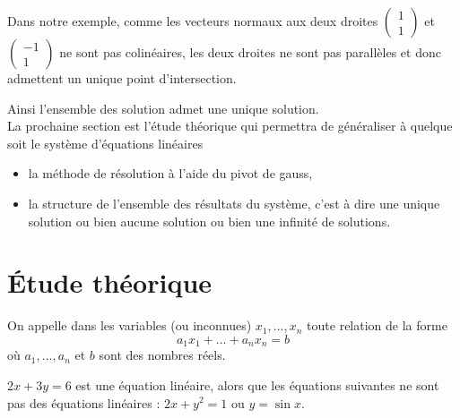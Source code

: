 \documentclass[a4paper]{book}
\begin{document}
Dans notre exemple, comme les vecteurs normaux aux deux droites $\begin{pmatrix}
1\\1
\end{pmatrix}$ et $\begin{pmatrix}
-1\\1
\end{pmatrix}$ ne sont pas colinéaires, les deux droites ne sont pas parallèles et donc admettent un unique point d'intersection.
\begin{center}
\end{center}
Ainsi l'ensemble des solution admet une unique solution.\\
La prochaine section est l'étude théorique qui permettra de généraliser à quelque soit le système d'équations linéaires
\begin{itemize}
\item la méthode de résolution à l'aide du pivot de gauss,
\item la structure de l'ensemble des résultats du système, c'est à dire  une unique solution ou bien aucune solution ou bien une infinité de solutions.
\end{itemize}


\section{Étude théorique}
\begin{Definition}
On appelle  dans les variables  (ou inconnues) $x_1,\dots,x_n$ toute
relation de la forme
$$a_1 x_1 + \dots + a_n x_n = b $$
où $a_1,\dots ,a_n$ et $b$ sont des nombres réels.\\
\end{Definition}
\begin{Exemple}
$2x + 3y = 6$ est une équation linéaire, alors que les équations suivantes ne sont pas des équations
linéaires :
$2x + y^2 = 1$ ou $y = \sin x$.
\end{Exemple}
\end{document}
